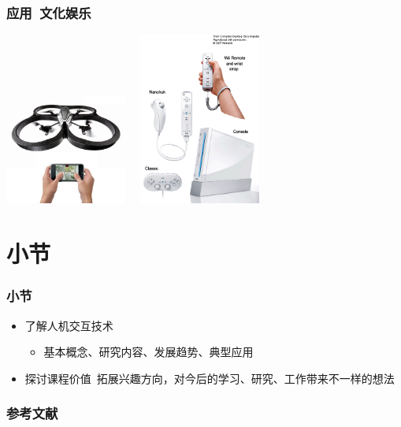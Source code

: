 \documentclass{beamer}
\begin{document}
\begin{frame}
	\frametitle{应用~{\small 文化娱乐}}
	\begin{center}
		\includegraphics[width=4cm]{images/ar-drone-parrot-quadricopter.jpg}~~
		\includegraphics[width=4cm]{images/wii.png}
	\end{center}
\end{frame}

\section{小节}
\begin{frame}
	\frametitle{小节}
	\begin{itemize}
		\item 了解人机交互技术
		\begin{itemize}
			\item {\small 基本概念、研究内容、发展趋势、典型应用}
		\end{itemize}
		\item 探讨课程价值~{\tiny 拓展兴趣方向，对今后的学习、研究、工作带来不一样的想法}
	\end{itemize}
\end{frame}

\begin{frame}
	\frametitle{参考文献}
	
	
\end{frame}
\end{document}
